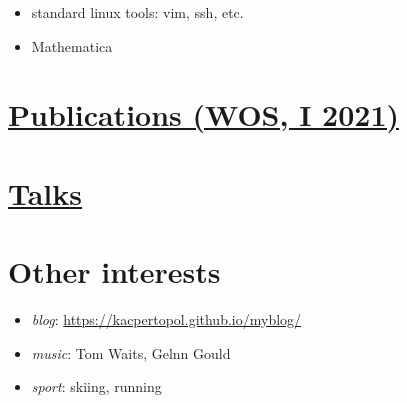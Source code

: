 \documentclass{article}
\providecommand{\tightlist}{%
  \setlength{\itemsep}{0pt}\setlength{\parskip}{0pt}}
\begin{document}
\begin{itemize}
  \begin{itemize}
  \tightlist
  \item
    standard linux tools: vim, ssh, etc.
  \item
    Mathematica
  \end{itemize}
\end{itemize}

\hypertarget{publications-wos-i-2021}{%
\section{\texorpdfstring{\href{./0pl.html}{Publications (WOS, I
2021)}}{Publications (WOS, I 2021)}}\label{publications-wos-i-2021}}

\hypertarget{talks}{%
\section{\texorpdfstring{\href{./00pl.html}{Talks}}{Talks}}\label{talks}}

\hypertarget{other-interests}{%
\section{Other interests}\label{other-interests}}

\begin{itemize}
\tightlist
\item
  \emph{blog}: \url{https://kacpertopol.github.io/myblog/}
\item
  \emph{music}: Tom Waits, Gelnn Gould
\item
  \emph{sport}: skiing, running
\end{itemize}
\end{document}
